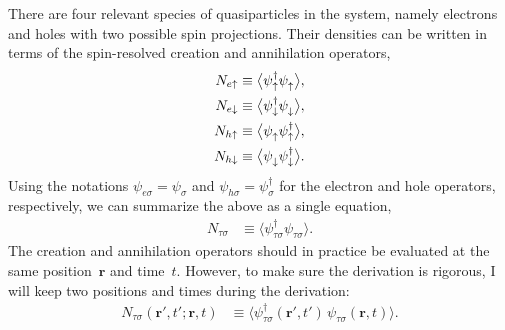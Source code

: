 There are four relevant species of quasiparticles in the system, namely electrons and holes with two possible spin projections.
Their densities can be written in terms of the spin-resolved creation and annihilation operators,
\begin{align}
  N_{e\uparrow} &\equiv \big\langle \psi_{\uparrow}^\dagger \psi_{\uparrow}^{\phantom{\dagger}} \big\rangle, \\
  N_{e\downarrow} &\equiv \big\langle \psi_{\downarrow}^\dagger \psi_{\downarrow}^{\phantom{\dagger}} \big\rangle, \\
  N_{h\uparrow} &\equiv \big\langle \psi_{\uparrow}^{\phantom{\dagger}} \psi_{\uparrow}^\dagger \big\rangle, \\
  N_{h\downarrow} &\equiv \big\langle \psi_{\downarrow}^{\phantom{\dagger}} \psi_{\downarrow}^\dagger \big\rangle.
\end{align}
Using the notations $\psi_{e\sigma} = \psi_\sigma$ and $\psi_{h\sigma} = \psi^\dagger_\sigma$ for the electron and hole operators, respectively, we can summarize the above as a single equation,
\begin{align}
  N_{\tau\sigma} &\equiv \big\langle \psi_{\tau\sigma}^\dagger \psi_{\tau\sigma}^{\phantom{\dagger}} \big\rangle.
\end{align}
The creation and annihilation operators should in practice be evaluated at the same position~$\bm{r}$ and time~$t$.
However, to make sure the derivation is rigorous, I will keep two positions and times during the derivation:
\begin{align}
  N_{\tau\sigma}(\bm{r}',t'; \bm{r},t) &\equiv \big\langle \psi_{\tau\sigma}^\dagger(\bm{r}',t')\, \psi_{\tau\sigma}^{\phantom{\dagger}}(\bm{r},t) \big\rangle.
\end{align}

